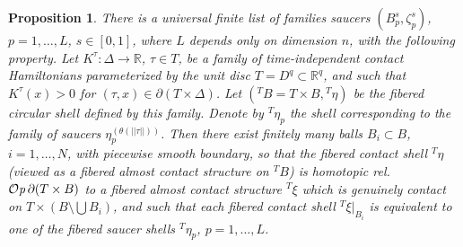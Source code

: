 \documentclass[12pt]{paper}
\theoremstyle{plain}
\newtheorem{proposition}[theorem]{Proposition}
\theoremstyle{definition}
\newcommand{\p}{\partial}
\newcommand{\R}{{\mathbb{R}}}
\def\Op{{\mathcal O}{\it p}\,}
\numberwithin{figure}{section}
\begin{document}
 
  
  \begin{proposition}\label{prop:circular-to-universal-param}
  There is a universal finite  list of families saucers $(B^{s}_p,\zeta^s_p)$, $p=1,\dots, L$, $s\in[0,1]$, where $L$ depends only on dimension $n$, with the following property. 
 Let  
   $K^\tau:\Delta\to\R$, $\tau\in T$,  be a family of 
   time-independent contact Hamiltonians parameterized by the unit disc  $T=D^q\subset\R^q$, 
   and such that $K^\tau(x)>0$ for $(\tau,x)\in \p(T\times\Delta)$.    Let $({}^TB=T\times B,{}^T\eta)$ be the fibered circular shell defined by this family.
   Denote by   ${}^T\eta_p$ the shell corresponding to the family of saucers $\eta^{(\theta(||\tau||))}_p$.
    Then  there exist finitely many balls $B_i\subset B $, $i=1,\dots, N$, with piecewise smooth boundary, so that the fibered  contact shell ${}^T\eta $ 
    (viewed as a fibered almost contact structure on ${}^TB $) is homotopic rel.\ $\Op \p (T\times B) $ 
    to a fibered almost contact structure ${}^T\xi$ which is genuinely 
    contact on $T\times(B \setminus \bigcup B_i)$, and  such that each fibered contact shell  ${}^T\xi|_{B_i}$  is equivalent to  one of the fibered saucer shells ${}^T\eta_p$, $p=1,\dots, L$.
     \end{proposition}
     
\end{document}
